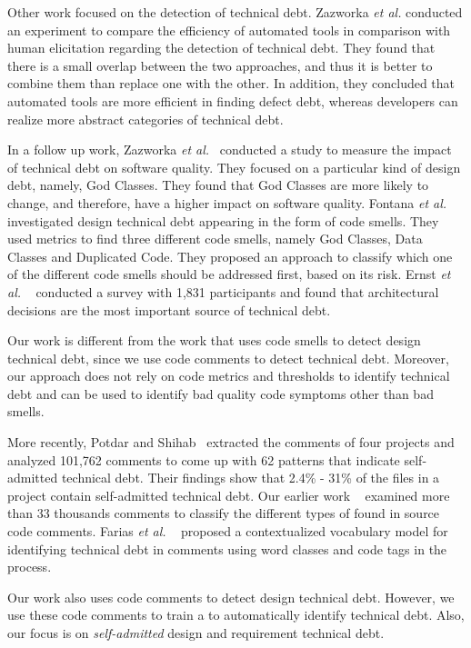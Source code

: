 Other work focused on the detection of technical debt. Zazworka \textit{et al.} \cite{Zazworka2013CSE} conducted an experiment to compare the efficiency of automated tools in comparison with human elicitation regarding the detection of technical debt. They found that there is a small overlap between the two approaches, and thus it is better to combine them than replace one with the other. In addition, they concluded that automated tools are more efficient in finding defect debt, whereas developers can realize more abstract categories of technical debt.

In a follow up work, Zazworka \textit{et al.}~\cite{Zazworka2011MTD} conducted a study to measure the impact of technical debt on software quality. They focused on a particular kind of design debt, namely, God Classes. They found that God Classes are more likely to change, and therefore, have a higher impact on software quality. Fontana \textit{et al.}~\cite{Fontana2012MTD} investigated design technical debt appearing in the form of code smells. They used metrics to find three different code smells, namely God Classes, Data Classes and Duplicated Code. They proposed an approach to classify which one of the different code smells should be addressed first, based on its risk. Ernst \textit{et al.} ~\cite{Ernst2015FSE} conducted a survey with 1,831 participants and found that architectural decisions are the most important source of technical debt.

Our work is different from the work that uses code smells to detect design technical debt, since we use code comments to detect technical debt. Moreover, our approach does not rely on code metrics and thresholds to identify technical debt and can be used to identify bad quality code symptoms other than bad smells.

More recently, Potdar and Shihab~\cite{Potdar2014ICSME} extracted the comments of four projects and analyzed 101,762 comments to come up with 62  patterns that indicate self-admitted technical debt. Their findings show that 2.4\% - 31\% of the files in a project contain self-admitted technical debt. Our earlier work ~\cite{Maldonado2015MTD} examined more than 33 thousands comments to classify the different types of \SATD found in source code comments. Farias \textit{et al.} ~\cite{Farias2015MTD} proposed a contextualized vocabulary model for identifying technical debt in comments using word classes and code tags in the process. 

Our work also uses code comments to detect design technical debt. However, we use these code comments to train a  to automatically identify technical debt. Also, our focus is on \emph{self-admitted} design and requirement technical debt.

